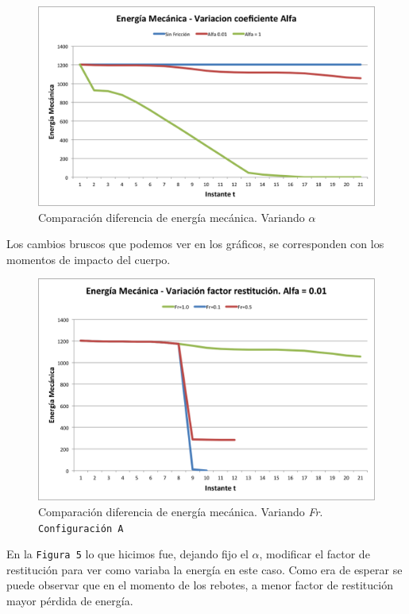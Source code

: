 \documentclass[a4paper]{article}
\begin{document}
\begin{figure}[H]
  \centering
  \includegraphics[scale=0.75]{graficos/4-energiaMecanica-alpha.png}
  \caption{Comparación diferencia de energía mecánica. Variando $\alpha$ }
\end{figure}

Los cambios bruscos que podemos ver en los gráficos, se corresponden con los momentos de impacto del cuerpo.

\begin{figure}[H]
  \centering
  \includegraphics[scale=0.75]{graficos/5-energiaMecanica-fr.png}
  \caption{Comparación diferencia de energía mecánica. Variando \textit{Fr}. \texttt{Configuración A} }
\end{figure}
 	
En la \texttt{Figura 5} lo que hicimos fue, dejando fijo el $\alpha$, modificar el factor de restitución para ver como variaba la energía en este caso. Como era de esperar se puede observar que en el momento de los rebotes, a menor factor de restitución mayor pérdida de energía.\\[1em]
\end{document}
